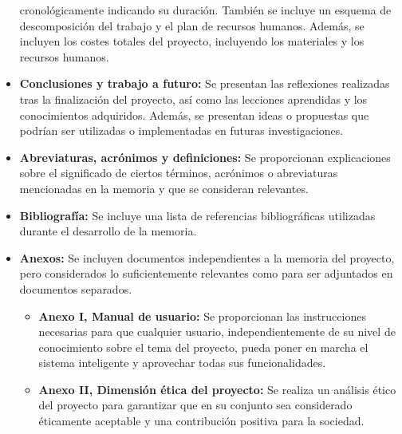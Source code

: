 \begin{itemize}
    cronológicamente indicando su duración. También se incluye un esquema de descomposición 
    del trabajo y el plan de recursos humanos. Además, se incluyen los costes totales del proyecto, 
    incluyendo los materiales y los recursos humanos.
    \item \textbf{Conclusiones y trabajo a futuro:} Se presentan las reflexiones realizadas 
    tras la finalización del proyecto, así como las lecciones aprendidas y los conocimientos 
    adquiridos. Además, se presentan ideas o propuestas que podrían ser utilizadas o implementadas 
    en futuras investigaciones.
    \item \textbf{Abreviaturas, acrónimos y definiciones:} Se proporcionan explicaciones sobre 
    el significado de ciertos términos, acrónimos o abreviaturas mencionadas en la memoria y 
    que se consideran relevantes.
    \item \textbf{Bibliografía:} Se incluye una lista de referencias bibliográficas utilizadas
    durante el desarrollo de la memoria.
    \item \textbf{Anexos:} Se incluyen documentos independientes a la memoria del proyecto, 
    pero considerados lo suficientemente relevantes como para ser adjuntados en documentos separados.
    \begin{itemize}
        \item \textbf{Anexo I, Manual de usuario:} Se proporcionan las instrucciones necesarias 
        para que cualquier usuario, independientemente de su nivel de conocimiento sobre el tema 
        del proyecto, pueda poner en marcha el sistema inteligente y aprovechar todas sus funcionalidades.
        \item \textbf{Anexo II, Dimensión ética del proyecto:} Se realiza un análisis ético del proyecto 
        para garantizar que en su conjunto sea considerado éticamente aceptable y una contribución positiva 
        para la sociedad.
    \end{itemize}

\end{itemize}



\pagebreak